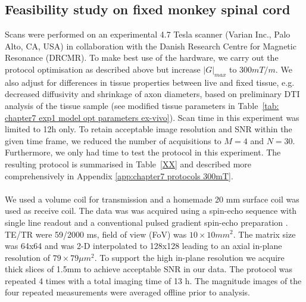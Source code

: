 \subsection{Feasibility study on fixed monkey spinal cord}
Scans were performed on an experimental 4.7 Tesla scanner (Varian Inc., Palo Alto, CA, USA) in collaboration with the Danish Research Centre for Magnetic Resonance (DRCMR). To make best use of the hardware, we carry out the protocol optimisation as described above but increase $|G|_{max}$ to $300mT/m$. We also adjust for differences in tissue properties between live and fixed tissue, e.g. decreased diffusivity and shrinkage of axon diameters, based on preliminary DTI analysis of the tissue sample (see modified tissue parameters in Table~\ref{tab: chapter7 exp1 model opt parameters ex-vivo}). Scan time in this experiment was limited to 12h only. To retain acceptable image resolution and SNR within the given time frame, we reduced the number of acquisitions to $M=4$ and $N=30$. Furthermore, we only had time to test the {\FD} protocol in this experiment. The resulting protocol is summarised in Table~\ref{XX} and described more comprehensively in Appendix \ref{app:chapter7 protocols 300mT}. 
\paragraph{}
We used a volume coil for transmission and a homemade 20 mm surface coil was used as receive coil. The data was was acquired using a spin-echo sequence with single line readout and a conventional pulsed gradient spin-echo preparation \citep{Stejskal:1965}.  TE/TR were 59/2000 ms, field of view (FoV) was $10\times 10 mm^2$. The matrix size was 64x64 and was 2-D interpolated to 128x128 leading to an axial in-plane resolution of $79 \times 79 \mu m^2$. To support the high in-plane resolution we acquire thick slices of 1.5mm to achieve acceptable \gls{SNR} in our data. The protocol was repeated 4 times with a total imaging time of 13 h. The magnitude images of the four repeated measurements were averaged offline prior to analysis.

